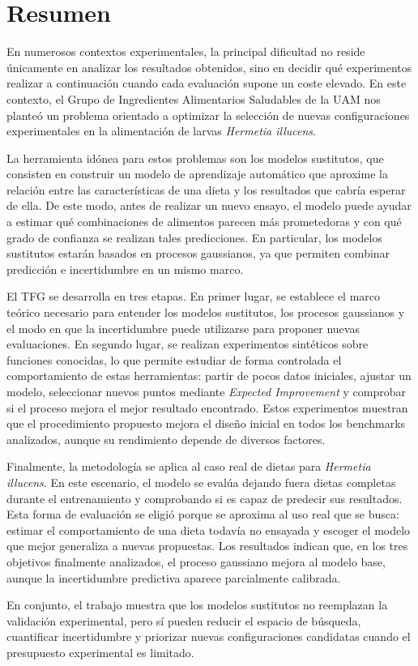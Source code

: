 \chapter*{Resumen}
En numerosos contextos experimentales, la principal dificultad no reside únicamente en analizar los resultados obtenidos, sino en decidir qué experimentos realizar a continuación cuando cada evaluación supone un coste elevado. 
En este contexto, el Grupo de Ingredientes Alimentarios Saludables de la UAM nos planteó un problema orientado a optimizar la selección de nuevas configuraciones experimentales en la alimentación de larvas \textit{Hermetia illucens}. 

La herramienta idónea para estos problemas son los modelos sustitutos, que consisten en construir un modelo de aprendizaje automático que aproxime la relación entre las características de una dieta y los resultados que cabría esperar de ella.
De este modo, antes de realizar un nuevo ensayo, el modelo puede ayudar a estimar qué combinaciones de alimentos parecen más prometedoras y con qué grado de confianza se realizan tales predicciones. En particular, los modelos sustitutos estarán basados en procesos gaussianos, ya que permiten combinar predicción e incertidumbre en un mismo marco. 

El TFG se desarrolla en tres etapas. En primer lugar, se establece el marco teórico necesario para entender los modelos sustitutos, los procesos gaussianos y el modo en que la incertidumbre puede utilizarse para proponer nuevas evaluaciones.
En segundo lugar, se realizan experimentos sintéticos sobre funciones conocidas, lo que permite estudiar de forma controlada el comportamiento de estas herramientas: partir de pocos datos iniciales, ajustar un modelo, seleccionar nuevos puntos mediante \textit{Expected Improvement} y comprobar si el proceso mejora el mejor resultado encontrado.
Estos experimentos muestran que el procedimiento propuesto mejora el diseño inicial en todos los benchmarks analizados, aunque su rendimiento depende de diversos factores.

Finalmente, la metodología se aplica al caso real de dietas para \textit{Hermetia illucens}. En este escenario, el modelo se evalúa dejando fuera dietas completas durante el entrenamiento y comprobando si es capaz de predecir sus resultados. Esta forma de evaluación se eligió porque se aproxima al uso real que se busca: estimar el comportamiento de una dieta todavía no ensayada y escoger el modelo que mejor generaliza a nuevas propuestas. Los resultados indican que, en los tres objetivos finalmente analizados, el proceso gaussiano mejora al modelo base, aunque la incertidumbre predictiva aparece parcialmente calibrada.

En conjunto, el trabajo muestra que los modelos sustitutos no reemplazan la validación experimental, pero sí pueden reducir el espacio de búsqueda, cuantificar incertidumbre y priorizar nuevas configuraciones candidatas cuando el presupuesto experimental es limitado. 

